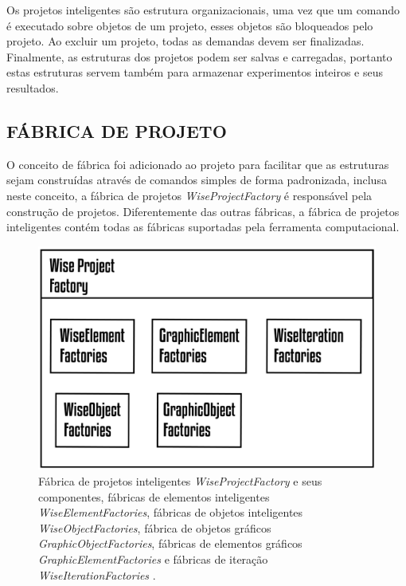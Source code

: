 \documentclass[a4paper,12pt]{monografia}
\theoremstyle{plain}
\theoremstyle{definition}
\theoremstyle{remark}
\begin{document}
Os projetos inteligentes são estrutura organizacionais, uma vez que um comando é executado sobre objetos de um projeto, esses objetos são bloqueados pelo projeto. Ao excluir um projeto, todas as demandas devem ser finalizadas. Finalmente, as estruturas dos projetos podem ser salvas e carregadas, portanto estas estruturas servem também para armazenar experimentos inteiros e seus resultados.

\subsection{FÁBRICA DE PROJETO}\label{sec:fabrica_projeto} 

O conceito de fábrica foi adicionado ao projeto para facilitar que as estruturas sejam construídas através de comandos simples de forma padronizada, inclusa neste conceito, a fábrica de projetos \textit{WiseProjectFactory} é responsável pela construção de projetos. Diferentemente das outras fábricas, a fábrica de projetos inteligentes contém todas as fábricas suportadas pela ferramenta computacional.

\begin{figure}[!htbp]
	\centering
	\includegraphics[scale=1.5]{Figures/WiseProjectFactory@16x.png}
	\caption{Fábrica de projetos inteligentes \textit{WiseProjectFactory} e seus componentes, fábricas de elementos inteligentes \textit{WiseElementFactories}, fábricas de objetos inteligentes \textit{WiseObjectFactories}, fábrica de objetos gráficos \textit{GraphicObjectFactories}, fábricas de elementos gráficos \textit{GraphicElementFactories} e fábricas de iteração \textit{WiseIterationFactories} .}
	\label{fig7:projectfactory}
\end{figure}
\end{document}
